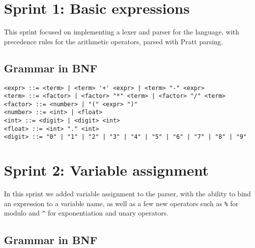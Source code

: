 \section{Sprint 1: Basic expressions}\label{sec:sprint-1:-basic-expressions}

This sprint focused on implementing a lexer and parser for the language, with precedence rules for the arithmetic 
operators, parsed with Pratt parsing.

\subsection{Grammar in BNF}\label{subsec:grammar-in-bnf1}

\begin{verbatim}
<expr> ::= <term> | <term> '+' <expr> | <term> "-" <expr>
<term> ::= <factor> | <factor> "*" <term> | <factor> "/" <term>
<factor> ::= <number> | "(" <expr> ")"
<number> ::= <int> | <float>
<int> ::= <digit> | <digit> <int>
<float> ::= <int> "." <int>
<digit> ::= "0" | "1" | "2" | "3" | "4" | "5" | "6" | "7" | "8" | "9"
\end{verbatim}

\section{Sprint 2: Variable assignment}\label{sec:variable-assignment}

In this sprint we added variable assignment to the parser, with the ability to bind an expression to a variable 
name, as well as a few new operators such as \texttt{\%} for modulo and \texttt{^} for exponentiation and unary operators.

\subsection{Grammar in BNF}\label{subsec:grammar-in-bnf2}

